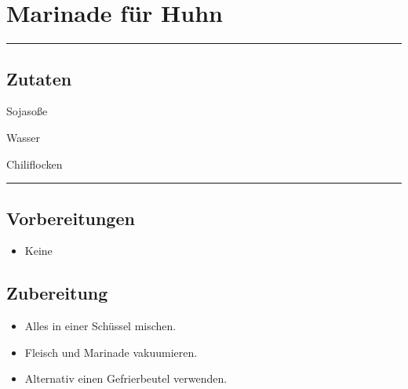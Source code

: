 \section*{Marinade für Huhn}

\bigbreak
\rule{\textwidth}{0.4pt}

\subsection*{Zutaten}

\begin{description}[align=right,leftmargin=!,labelwidth=\widthof{\bfseries xxPrisen}]
    \item[*] Sojasoße
    \item[*] Wasser
    \item[*] Chiliflocken
\end{description}


\rule{\textwidth}{0.4pt}


\subsection*{Vorbereitungen}

\begin{itemize}
    \item Keine
\end{itemize}


\bigbreak
\subsection*{Zubereitung}

\begin{itemize}
    \item Alles in einer Schüssel mischen.
    \item Fleisch und Marinade vakuumieren.
    \item Alternativ einen Gefrierbeutel verwenden.
\end{itemize}
